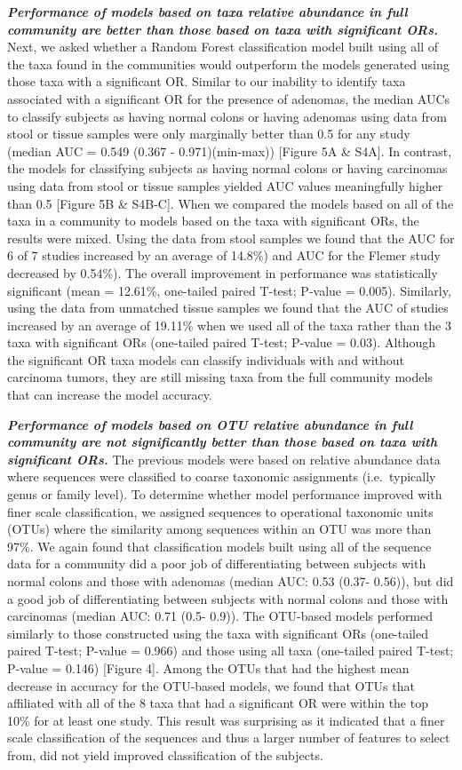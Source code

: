 \documentclass[12pt,]{article}
\begin{document}
\textbf{\emph{Performance of models based on taxa relative abundance in
full community are better than those based on taxa with significant
ORs.}} Next, we asked whether a Random Forest classification model built
using all of the taxa found in the communities would outperform the
models generated using those taxa with a significant OR. Similar to our
inability to identify taxa associated with a significant OR for the
presence of adenomas, the median AUCs to classify subjects as having
normal colons or having adenomas using data from stool or tissue samples
were only marginally better than 0.5 for any study (median AUC = 0.549
(0.367 - 0.971)(min-max)) {[}Figure 5A \& S4A{]}. In contrast, the
models for classifying subjects as having normal colons or having
carcinomas using data from stool or tissue samples yielded AUC values
meaningfully higher than 0.5 {[}Figure 5B \& S4B-C{]}. When we compared
the models based on all of the taxa in a community to models based on
the taxa with significant ORs, the results were mixed. Using the data
from stool samples we found that the AUC for 6 of 7 studies increased by
an average of 14.8\%) and AUC for the Flemer study decreased by 0.54\%).
The overall improvement in performance was statistically significant
(mean = 12.61\%, one-tailed paired T-test; P-value = 0.005). Similarly,
using the data from unmatched tissue samples we found that the AUC of
studies increased by an average of 19.11\% when we used all of the taxa
rather than the 3 taxa with significant ORs (one-tailed paired T-test;
P-value = 0.03). Although the significant OR taxa models can classify
individuals with and without carcinoma tumors, they are still missing
taxa from the full community models that can increase the model
accuracy.

\textbf{\emph{Performance of models based on OTU relative abundance in
full community are not significantly better than those based on taxa
with significant ORs.}} The previous models were based on relative
abundance data where sequences were classified to coarse taxonomic
assignments (i.e.~typically genus or family level). To determine whether
model performance improved with finer scale classification, we assigned
sequences to operational taxonomic units (OTUs) where the similarity
among sequences within an OTU was more than 97\%. We again found that
classification models built using all of the sequence data for a
community did a poor job of differentiating between subjects with normal
colons and those with adenomas (median AUC: 0.53 (0.37- 0.56)), but did
a good job of differentiating between subjects with normal colons and
those with carcinomas (median AUC: 0.71 (0.5- 0.9)). The OTU-based
models performed similarly to those constructed using the taxa with
significant ORs (one-tailed paired T-test; P-value = 0.966) and those
using all taxa (one-tailed paired T-test; P-value = 0.146) {[}Figure
4{]}. Among the OTUs that had the highest mean decrease in accuracy for
the OTU-based models, we found that OTUs that affiliated with all of the
8 taxa that had a significant OR were within the top 10\% for at least
one study. This result was surprising as it indicated that a finer scale
classification of the sequences and thus a larger number of features to
select from, did not yield improved classification of the subjects.
\end{document}

